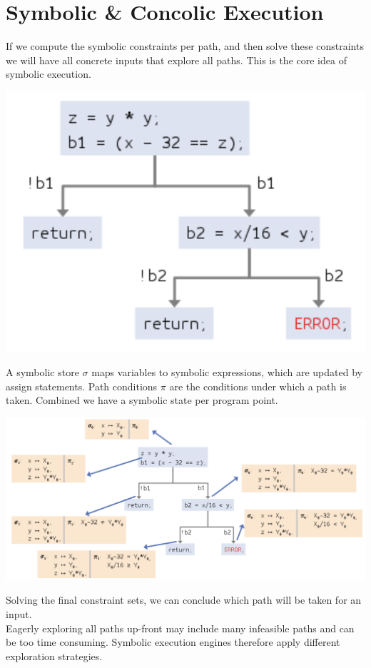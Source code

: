 \section{Symbolic \& Concolic Execution}


If we compute the symbolic constraints per path, and then solve these constraints we will have all concrete inputs that explore all paths. This is the core idea of symbolic execution.

\begin{center}
	\includegraphics[width=0.5\columnwidth]{assets/path}
\end{center}

A symbolic store $\sigma$ maps variables to symbolic expressions, which are updated by assign statements. Path conditions $\pi$ are the conditions under which a path is taken. Combined we have a symbolic state per program point.
\begin{center}
	\includegraphics[width=\columnwidth]{assets/symbolic_execution}
\end{center}

Solving the final constraint sets, we can conclude which path will be taken for an input. \\

Eagerly exploring all paths up-front may include many infeasible paths and can be too time consuming. Symbolic execution engines therefore apply different exploration strategies. \\

